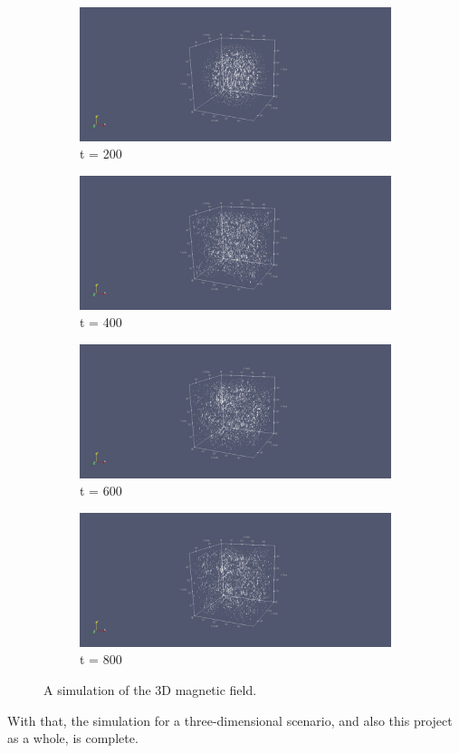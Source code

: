 \begin{figure}[h!]
	\centering
	\begin{subfigure}{.49\textwidth}
		\centering
		\includegraphics[width=.95\linewidth]{Figures/FDTD3DH1}
		\caption{t = 200}
	\end{subfigure}
	\begin{subfigure}{.49\textwidth}
		\centering
		\includegraphics[width=.95\linewidth]{Figures/FDTD3DH2}
		\caption{t = 400}
	\end{subfigure}
	\begin{subfigure}{.49\textwidth}
		\centering
		\includegraphics[width=.95\linewidth]{Figures/FDTD3DH3}
		\caption{t = 600}
	\end{subfigure}
	\begin{subfigure}{.49\textwidth}
		\centering
		\includegraphics[width=.95\linewidth]{Figures/FDTD3DH4}
		\caption{t = 800}
	\end{subfigure}
	\decoRule
	\caption[3D Magnetic Field Simulation]{A simulation of the 3D magnetic field.}
	\label{fig:FDTD3DH}
\end{figure}

With that, the simulation for a three-dimensional scenario, and also this project as a whole, is complete. 